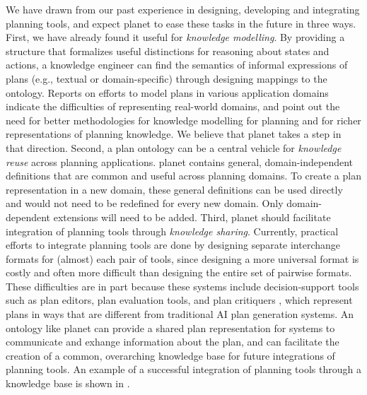 We have drawn from our past experience in 
designing, developing and integrating planning tools,
and expect {\sc planet} to ease these tasks in the future 
in three ways.  
First, we have already found it useful for {\em knowledge modelling}.
By providing a structure that formalizes useful distinctions for
reasoning about states and actions, a knowledge engineer 
can find the semantics of informal expressions of plans 
(e.g., textual or domain-specific) through designing mappings to the 
ontology.  
Reports on efforts to model plans in various application domains 
\cite{nau-ijcai95,knoblock-aips96} 
indicate the difficulties of representing real-world domains,
and point out the need for better methodologies for knowledge modelling 
for planning and for richer representations of planning knowledge.  
We believe that {\sc planet} takes a step in that direction.
Second, a plan ontology can be a central vehicle 
for {\em knowledge reuse} across planning applications.
{\sc planet} contains general, domain-independent definitions that 
are common and useful across planning domains.  To create a 
plan representation in a new domain, 
these general definitions can be used directly and 
would not need to be redefined for every new domain.
Only domain-dependent extensions will need to be added.
Third, {\sc planet} should facilitate integration of planning tools
through {\em knowledge sharing}.  
Currently, practical efforts to integrate planning tools 
are done by designing separate interchange formats for 
(almost) each pair of tools,
since designing a more universal format is costly and often more difficult
than designing the entire set of pairwise formats.
These difficulties are in part because
these systems include decision-support tools such as 
plan editors, plan evaluation tools, and plan critiquers \cite{IFD4},
which represent plans in ways that are different from 
traditional AI plan generation systems. 
An ontology like {\sc planet} can provide a
shared plan representation for systems to communicate 
and exhange information about the plan,
and can facilitate the creation of a
common, overarching knowledge base for 
future integrations of planning tools.
An example of a successful integration of planning tools through a 
knowledge base is shown in \cite{valente-ieee99}.

